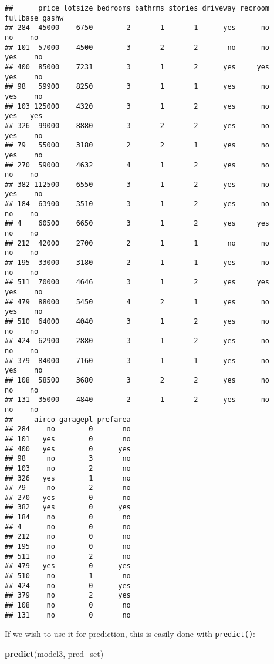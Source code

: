 \documentclass[
]{article}
\newenvironment{Shaded}{\begin{snugshade}}{\end{snugshade}}
\newcommand{\KeywordTok}[1]{\textcolor[rgb]{0.13,0.29,0.53}{\textbf{#1}}}
\newcommand{\NormalTok}[1]{#1}
\begin{document}
\begin{verbatim}
##      price lotsize bedrooms bathrms stories driveway recroom fullbase gashw
## 284  45000    6750        2       1       1      yes      no       no    no
## 101  57000    4500        3       2       2       no      no      yes    no
## 400  85000    7231        3       1       2      yes     yes      yes    no
## 98   59900    8250        3       1       1      yes      no      yes    no
## 103 125000    4320        3       1       2      yes      no      yes   yes
## 326  99000    8880        3       2       2      yes      no      yes    no
## 79   55000    3180        2       2       1      yes      no      yes    no
## 270  59000    4632        4       1       2      yes      no       no    no
## 382 112500    6550        3       1       2      yes      no      yes    no
## 184  63900    3510        3       1       2      yes      no       no    no
## 4    60500    6650        3       1       2      yes     yes       no    no
## 212  42000    2700        2       1       1       no      no       no    no
## 195  33000    3180        2       1       1      yes      no       no    no
## 511  70000    4646        3       1       2      yes     yes      yes    no
## 479  88000    5450        4       2       1      yes      no      yes    no
## 510  64000    4040        3       1       2      yes      no       no    no
## 424  62900    2880        3       1       2      yes      no       no    no
## 379  84000    7160        3       1       1      yes      no      yes    no
## 108  58500    3680        3       2       2      yes      no       no    no
## 131  35000    4840        2       1       2      yes      no       no    no
##     airco garagepl prefarea
## 284    no        0       no
## 101   yes        0       no
## 400   yes        0      yes
## 98     no        3       no
## 103    no        2       no
## 326   yes        1       no
## 79     no        2       no
## 270   yes        0       no
## 382   yes        0      yes
## 184    no        0       no
## 4      no        0       no
## 212    no        0       no
## 195    no        0       no
## 511    no        2       no
## 479   yes        0      yes
## 510    no        1       no
## 424    no        0      yes
## 379    no        2      yes
## 108    no        0       no
## 131    no        0       no
\end{verbatim}

If we wish to use it for prediction, this is easily done with \texttt{predict()}:

\begin{Shaded}
\begin{Highlighting}[]
\KeywordTok{predict}\NormalTok{(model3, pred\_set)}
\end{Highlighting}
\end{Shaded}
\end{document}
